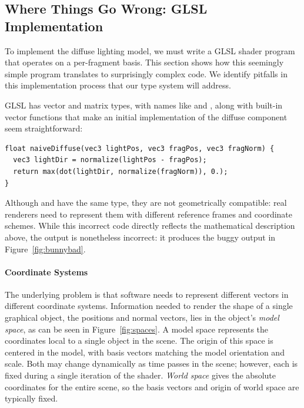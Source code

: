 \subsection{Where Things Go Wrong: GLSL Implementation}
\label{subsec:wrong}
To implement the diffuse lighting model, we must write a GLSL shader program that operates on a per-fragment basis. 
This section shows how this seemingly simple program translates to surprisingly complex code.
We identify pitfalls in this implementation process that our type system will address.

GLSL has vector and matrix types, with names like  and , along with built-in vector functions that make an initial implementation of the diffuse component seem straightforward:
%
\begin{lstlisting}
float naiveDiffuse(vec3 lightPos, vec3 fragPos, vec3 fragNorm) {
  vec3 lightDir = normalize(lightPos - fragPos);
  return max(dot(lightDir, normalize(fragNorm)), 0.);
}
\end{lstlisting}
%
Although  and  have the same type, they are not geometrically compatible: real renderers need to represent them with different reference frames and coordinate schemes.
While this incorrect code directly reflects the mathematical description above, the output is nonetheless incorrect:
it produces the buggy output in Figure~\ref{fig:bunnybad}.


\paragraph{Coordinate Systems}
The underlying problem is that software needs to represent different vectors in different coordinate systems.
Information needed to render the shape of a single graphical object, the positions and normal vectors, lies in the object's \emph{model space}, as can be seen in Figure~\ref{fig:spaces}.
A model space represents the coordinates local to a single object in the scene.
The origin of this space is centered in the model, with basis vectors matching the model orientation and scale.
Both may change dynamically as time passes in the scene; however, each is fixed during a single iteration of the shader.
\emph{World space} gives the absolute coordinates for the entire scene, so the basis vectors and origin of world space are typically fixed.

